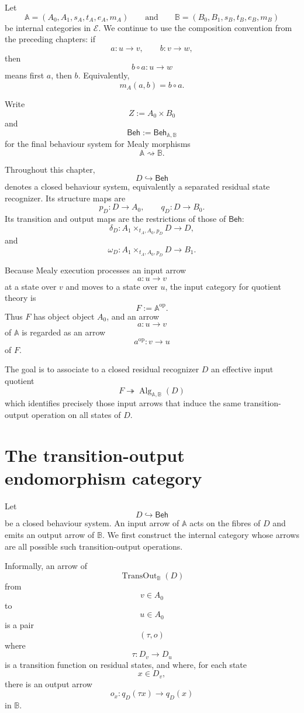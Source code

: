 Let
\[
\mathbb A
=
(A_0,A_1,s_A,t_A,e_A,m_A)
\qquad\text{and}\qquad
\mathbb B
=
(B_0,B_1,s_B,t_B,e_B,m_B)
\]
be internal categories in \(\mathcal E\). We continue to use the composition
convention from the preceding chapters: if
\[
a:u\to v,
\qquad
b:v\to w,
\]
then
\[
b\circ a:u\to w
\]
means first \(a\), then \(b\). Equivalently,
\[
m_A(a,b)=b\circ a.
\]

Write
\[
Z:=A_0\times B_0
\]
and
\[
\mathsf{Beh}
:=
\mathsf{Beh}_{\mathbb A,\mathbb B}
\]
for the final behaviour system for Mealy morphisms
\[
\mathbb A\rightsquigarrow\mathbb B.
\]

Throughout this chapter,
\[
D\hookrightarrow\mathsf{Beh}
\]
denotes a closed behaviour system, equivalently a separated residual state
recognizer. Its structure maps are
\[
p_D:D\to A_0,
\qquad
q_D:D\to B_0.
\]
Its transition and output maps are the restrictions of those of
\(\mathsf{Beh}\):
\[
\delta_D:
A_1\times_{t_A,A_0,p_D}D\to D,
\]
and
\[
\omega_D:
A_1\times_{t_A,A_0,p_D}D\to B_1.
\]

Because Mealy execution processes an input arrow
\[
a:u\to v
\]
at a state over \(v\) and moves to a state over \(u\), the input category for
quotient theory is
\[
F:=\mathbb A^{\mathrm{op}}.
\]
Thus \(F\) has object object \(A_0\), and an arrow
\[
a:u\to v
\]
of \(\mathbb A\) is regarded as an arrow
\[
a^{\mathrm{op}}:v\to u
\]
of \(F\).

The goal is to associate to a closed residual recognizer \(D\) an effective
input quotient
\[
F\twoheadrightarrow \operatorname{Alg}_{\mathbb A,\mathbb B}(D)
\]
which identifies precisely those input arrows that induce the same
transition-output operation on all states of \(D\).

\section{The transition-output endomorphism category}
\label{sec:reiterman-transout-category}

Let
\[
D\hookrightarrow\mathsf{Beh}
\]
be a closed behaviour system. An input arrow of \(\mathbb A\) acts on the
fibres of \(D\) and emits an output arrow of \(\mathbb B\). We first construct
the internal category whose arrows are all possible such transition-output
operations.

Informally, an arrow of
\[
\operatorname{TransOut}_{\mathbb B}(D)
\]
from
\[
v\in A_0
\]
to
\[
u\in A_0
\]
is a pair
\[
(\tau,o)
\]
where
\[
\tau:D_v\to D_u
\]
is a transition function on residual states, and where, for each state
\[
x\in D_v,
\]
there is an output arrow
\[
o_x:q_D(\tau x)\to q_D(x)
\]
in \(\mathbb B\).

